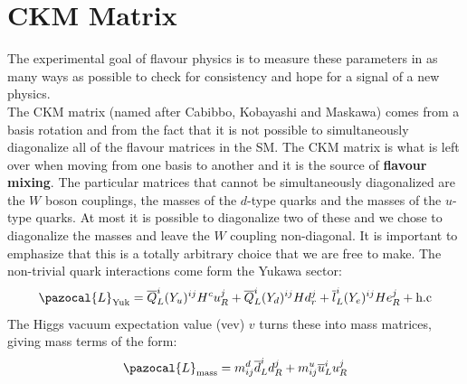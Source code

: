\documentclass[../main.tex]{subfiles}
\begin{document}
\section{CKM Matrix}
The experimental goal of flavour physics is to measure these parameters in as many ways as possible to check for consistency and hope for a signal of a new physics.\\
The CKM matrix (named after Cabibbo, Kobayashi and Maskawa) comes from a basis rotation and from the fact that it is not possible to simultaneously diagonalize all of the flavour matrices in the SM. The CKM matrix is what is left over when moving from one basis to another and it is the source of \textbf{flavour mixing}. The
particular matrices that cannot be simultaneously diagonalized are the $W$ boson couplings, the masses of the $d$-type quarks and the masses of the $u$-type quarks. At most it is possible to diagonalize two of these and we chose to diagonalize the masses and leave the $W$ coupling non-diagonal. It is
important to emphasize that this is a totally arbitrary choice that we are free to make. The non-trivial quark interactions come form the Yukawa sector:
\[
\pazocal{L}_{\text{Yuk}}=\overline{Q}_L^i(Y_u)^{ij}H^cu_R^j+\overline{Q}_L^i(Y_d)^{ij}Hd_r^j+\overline{l}_L^i(Y_e)^{ij}He_R^j+\text{h.c}
\]
The Higgs vacuum expectation value (vev) $v$ turns these into mass matrices, giving mass terms of the form:
\[
\pazocal{L}_{\text{mass}}=m_{ij}^d\overline{d}_L^id_R^j+m_{ij}^u\overline{u}_L^iu_R^j
\]
\end{document}
